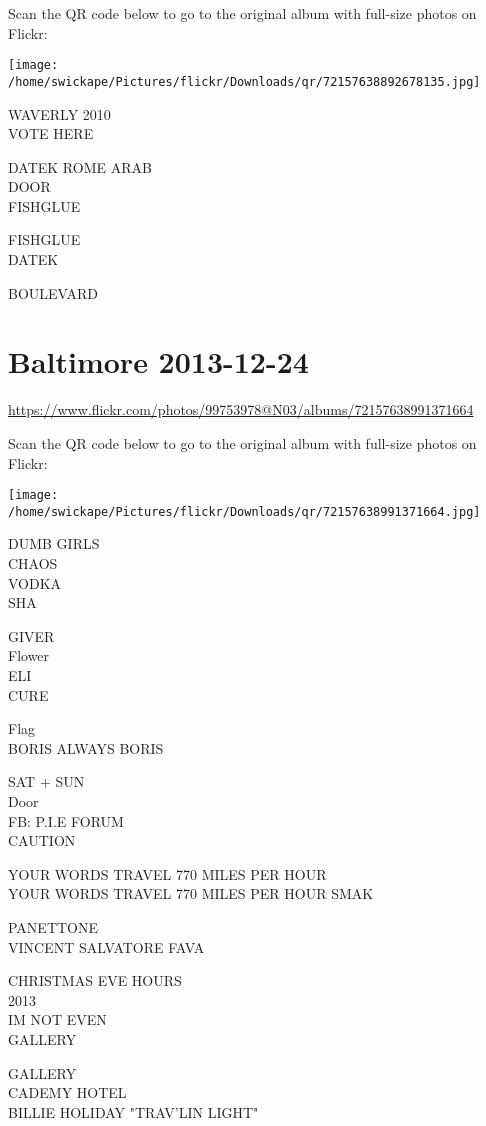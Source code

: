 \documentclass[10pt,letterpaper]{article}
\begin{document}
Scan the QR code below to go to the original album with full-size photos on Flickr:

\texttt{[image: /home/swickape/Pictures/flickr/Downloads/qr/72157638892678135.jpg]}


WAVERLY 2010\\
VOTE HERE

DATEK ROME ARAB\\
DOOR\\
FISHGLUE

FISHGLUE\\
DATEK

BOULEVARD


\section*{Baltimore 2013-12-24}

\url{https://www.flickr.com/photos/99753978@N03/albums/72157638991371664}

Scan the QR code below to go to the original album with full-size photos on Flickr:

\texttt{[image: /home/swickape/Pictures/flickr/Downloads/qr/72157638991371664.jpg]}


DUMB GIRLS\\
CHAOS\\
VODKA\\
SHA

GIVER\\
Flower\\
ELI\\
CURE

Flag\\
BORIS ALWAYS BORIS

SAT + SUN\\
Door\\
FB: P.I.E FORUM\\
CAUTION

YOUR WORDS TRAVEL 770 MILES PER HOUR\\
YOUR WORDS TRAVEL 770 MILES PER HOUR SMAK

PANETTONE\\
VINCENT SALVATORE FAVA

CHRISTMAS EVE HOURS\\
2013\\
IM NOT EVEN\\
GALLERY

GALLERY\\
CADEMY HOTEL\\
BILLIE HOLIDAY "TRAV'LIN LIGHT"
\end{document}
